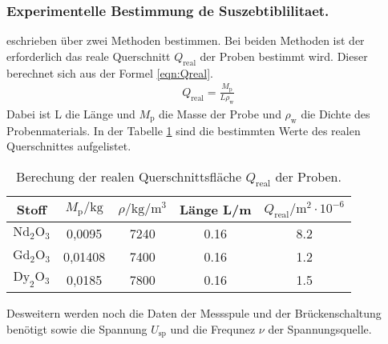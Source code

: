 \subsubsection{Experimentelle Bestimmung de Suszebtiblilitaet.}
eschrieben über zwei Methoden bestimmen. Bei beiden Methoden ist der
erforderlich das reale Querschnitt $Q_\mathrm{real}$ der Proben bestimmt wird.
Dieser berechnet sich aus der Formel \eqref{eqn:Qreal}.
\begin{align}
  Q_\mathrm{real}=\frac{M_\mathrm{p}}{L\rho_\mathrm{w}}\label{eqn:Qreal}
\end{align}
Dabei ist L die Länge und $M_\mathrm{p}$ die Masse der Probe und
$\rho_\mathrm{w}$ die Dichte des Probenmaterials.
In der Tabelle \ref{tab:Q} sind die bestimmten Werte des realen Querschnittes aufgelistet.
\begin{table}
  \centering
  \caption{Berechung der realen Querschnittsfläche $Q_\mathrm{real}$ der Proben.}
  \label{tab:Q}
  \begin{tabular}{c c c c c}
  Stoff &  $M_\mathrm{p}/\si{\kilo\gram}$ & $\rho/\si{\kilo\gram\per\meter\tothe{3}}$ & Länge L/\si{\meter} & $Q_\mathrm{real}/\si{\meter\tothe{2}}\cdot 10^{-6}$\\
     \midrule
     $\mathrm{Nd_2O_3}$ & 0,0095  & 7240 & 0.16 & 8.2\\
     $\mathrm{Gd_2O_3}$ & 0,01408 & 7400 & 0.16 & 1.2\\
     $\mathrm{Dy_2O_3}$ & 0,0185  & 7800 & 0.16 & 1.5\\
     \bottomrule
  \end{tabular}
\end{table}
\FloatBarrier
Desweitern werden noch die Daten der Messspule und der Brückenschaltung benötigt sowie
die Spannung $U_\mathrm{sp}$ und die Frequnez $\nu$ der Spannungsquelle.

